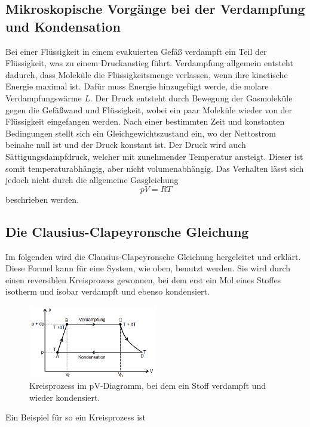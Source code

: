 \subsection{Mikroskopische Vorgänge bei der Verdampfung und Kondensation} %
\label{sub:Mikro_Vorgänge}
Bei einer Flüssigkeit in einem evakuierten Gefäß verdampft ein Teil der Flüssigkeit, was zu einem Druckanstieg führt.
Verdampfung allgemein entsteht dadurch, dass Moleküle die Flüssigkeitsmenge verlassen, wenn ihre kinetische Energie maximal ist.
Dafür muss Energie hinzugefügt werde, die molare Verdampfungswärme $L$.
Der Druck entsteht durch Bewegung der Gasmoleküle gegen die Gefäßwand und Flüssigkeit, wobei ein paar Moleküle wieder von der Flüssigkeit eingefangen werden.
Nach einer bestimmten Zeit und konstanten Bedingungen stellt sich ein Gleichgewichtszustand ein, wo der Nettostrom beinahe null ist und der Druck konstant ist.
Der Druck wird auch Sättigungsdampfdruck, welcher mit zunehmender Temperatur ansteigt.
Dieser ist somit temperaturabhängig, aber nicht volumenabhängig.
Das Verhalten lässt sich jedoch nicht durch die allgemeine Gasgleichung
\begin{equation*}
    pV = RT
\end{equation*}
beschrieben werden.

 
\subsection{Die Clausius-Clapeyronsche Gleichung} %
\label{sub:CC-Gl}
Im folgenden wird die Clausius-Clapeyronsche Gleichung hergeleitet und erklärt. 
Diese Formel kann für eine System, wie oben, benutzt werden.
Sie wird durch einen reversiblen Kreisprozess gewonnen, bei dem erst ein Mol eines Stoffes isotherm und isobar verdampft und ebenso kondensiert.
\begin{figure}[H]
    \centering
    \includegraphics[width=0.5\textwidth]{build/Abb_2.PNG}
    \caption {Kreisprozess im pV-Diagramm, bei dem ein Stoff verdampft und wieder kondensiert.\cite{v203}}
    \label{fig:Abb_2}
\end{figure}
\noindent Ein Beispiel für so ein Kreisprozess ist 
